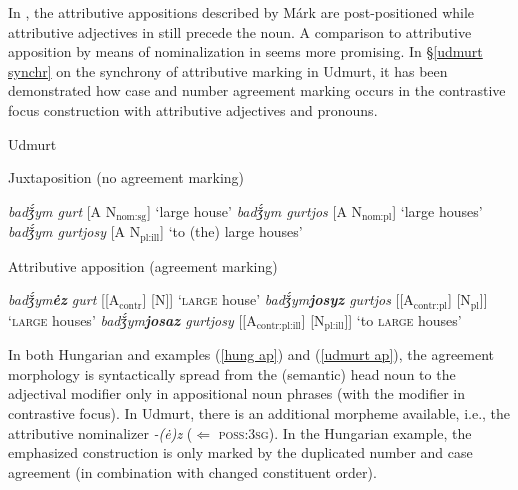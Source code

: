 {In , the attributive appositions described by Márk are post\hyp{}positioned while attributive adjectives in  still precede the noun. A comparison to attributive apposition by means of nominalization in  seems more promising. In \S\ref{udmurt synchr} on the synchrony of attributive marking in Udmurt, it has been demonstrated how case and number agreement marking occurs in the contrastive focus construction with attributive adjectives and pronouns.
\begin{exe} \label{udmurt ap}
\ex \rm{Udmurt \citep{winkler2001}}
\begin{xlist}
\ex 	\rm{Juxtaposition (no agreement marking)}
\begin{xlist}
\ex	\textit{badǯ́ym gurt} 				\rm{[A N$_{\text{nom:sg}}$] ‘large house’}
\ex	\textit{badǯ́ym gurtjos} 			\rm{[A N$_{\text{nom:pl}}$] ‘large houses’}
\ex	\textit{badǯ́ym gurtjosy} 			\rm{[A N$_{\text{pl:ill}}$] ‘to (the) large houses’}
\end{xlist}
\ex	\rm{Attributive apposition (agreement marking)}
\begin{xlist}
\ex	\textit{badǯ́ym\textbf{ėz} gurt} 		\rm{[[A$_{\text{contr}}$] [N]] ‘\textsc{large} house’}
\ex	\textit{badǯ́ym\textbf{josyz} gurtjos} 	\rm{[[A$_{\text{contr:pl}}$] [N$_{\text{pl}}$]] ‘\textsc{large} houses’}
\ex	\textit{badǯ́ym\textbf{josaz} gurtjosy} 	\rm{[[A$_{\text{contr:pl:ill}}$] [N$_{\text{pl:ill}}$]] ‘to \textsc{large} houses’}
\end{xlist}
\end{xlist}
\end{exe}
In both Hungarian and  examples (\ref{hung ap}) and (\ref{udmurt ap}), the agreement morphology is syntactically spread from the (semantic) head noun to the adjectival modifier only in appositional noun phrases (with the modifier in contrastive focus). In Udmurt, there is an additional morpheme available, i.e., the attributive nominalizer \textit{-(ė)z} ($\Leftarrow$ \textsc{poss:3sg}). In the Hungarian example, the emphasized construction is only marked by the duplicated number and case agreement (in combination with changed constituent order).

}
